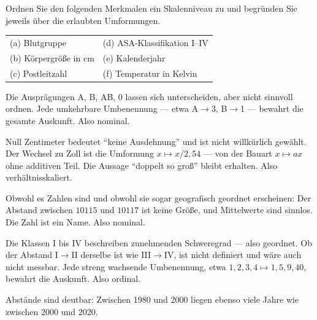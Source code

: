\begin{aufgabe}
Ordnen Sie den folgenden Merkmalen ein Skalenniveau zu und begründen Sie jeweils über die erlaubten Umformungen.

\begin{center}
{\small
\renewcommand{\arraystretch}{1.35}
\begin{tabular}{@{}P{4.0cm}P{4.4cm}@{}}
\toprule
(a) Blutgruppe & (d) ASA-Klassifikation I--IV\\
(b) Körpergröße in cm & (e) Kalenderjahr\\
(c) Postleitzahl & (f) Temperatur in Kelvin\\
\bottomrule
\end{tabular}}
\end{center}

\loesung
{}
Die Ausprägungen A, B, AB, 0 lassen sich unterscheiden, aber nicht sinnvoll ordnen. Jede umkehrbare Umbenennung --- etwa A$\to$3, B$\to$1 --- bewahrt die gesamte Auskunft. Also nominal.

Null Zentimeter bedeutet \enquote{keine Ausdehnung} und ist nicht willkürlich gewählt. Der Wechsel zu Zoll ist die Umformung $x \mapsto x/2{,}54$ --- von der Bauart $x \mapsto ax$ ohne additiven Teil. Die Aussage \enquote{doppelt so groß} bleibt erhalten. Also verhältnisskaliert.

Obwohl es Zahlen sind und obwohl sie sogar geografisch geordnet erscheinen: Der Abstand zwischen $10115$ und $10117$ ist keine Größe, und Mittelwerte sind sinnlos. Die Zahl ist ein Name. Also nominal.

\begin{center}
\begin{minipage}{0.86\textwidth}
\end{minipage}
\end{center}

Die Klassen I bis IV beschreiben zunehmenden Schweregrad --- also geordnet. Ob der Abstand I$\to$II derselbe ist wie III$\to$IV, ist nicht definiert und wäre auch nicht messbar. Jede streng wachsende Umbenennung, etwa $1,2,3,4 \mapsto 1,5,9,40$, bewahrt die Auskunft. Also ordinal.

Abstände sind deutbar: Zwischen 1980 und 2000 liegen ebenso viele Jahre wie zwischen 2000 und 2020.


\end{aufgabe}

